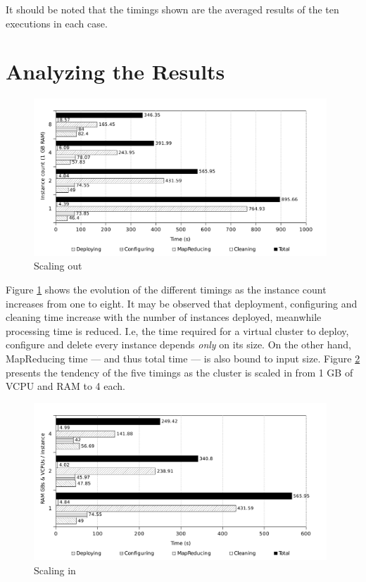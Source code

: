 It should be noted that the timings shown are the averaged results of the ten executions in each case.

\section{Analyzing the Results}\label{sec:analisisresultados}

\begin{figure}[tbp]
\begin{center}
\includegraphics[width=0.98\textwidth]{imagenes/039bw.pdf}
\caption{Scaling out}
\label{fig:eschorizontal}
\end{center}
\end{figure}

\noindent Figure \ref{fig:eschorizontal} shows the evolution of the different timings as the instance count increases from one to eight. It may be observed that deployment, configuring and cleaning time increase with the number of instances deployed, meanwhile processing time is reduced. I.e, the time required for a virtual cluster to deploy, configure and delete every instance depends \emph{only} on its size. On the other hand, MapReducing time --- and thus total time --- is also bound to input size. Figure \ref{fig:escvertical} presents the tendency of the five timings as the cluster is scaled in from 1 GB of VCPU and RAM to 4 each.

\begin{figure}[tbp]
\begin{center}
\includegraphics[width=0.98\textwidth]{imagenes/041bw.pdf}
\caption{Scaling in}
\label{fig:escvertical}
\end{center}
\end{figure}

